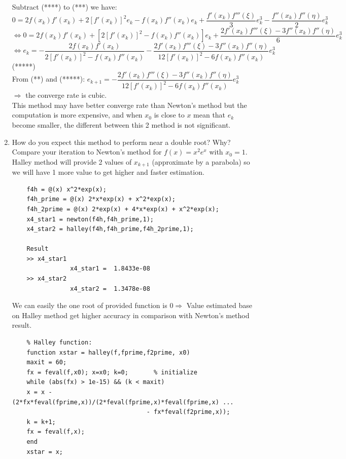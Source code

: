 \documentclass[14pt,a4paper]{article}
\begin{document}
\begin{enumerate}
	Subtract (****) to (***) we have:\\
	\hspace*{1cm} $ 0 = 2f(x_k)f'(x_k) + 2[f'(x_k)]^2e_k - f(x_k)f''(x_k)e_k + \dfrac{f'(x_k)f'''(\xi)}{3}e_k^3 - \dfrac{f''(x_k)f''(\eta)}{2}e_k^3$\\
	\hspace*{0.5cm} $\Leftrightarrow 0 = 2f(x_k)f'(x_k) + \left[2[f'(x_k)]^2 - f(x_k)f''(x_k)\right]e_k + \dfrac{2f'(x_k)f'''(\xi) -3f''(x_k)f''(\eta)}{6} e_k^3$\\
	\hspace*{0.5cm} $\Leftrightarrow e_k = -\dfrac{2f(x_k)f'(x_k)}{2[f'(x_k)]^2 - f(x_k)f''(x_k)} - \dfrac{2f'(x_k)f'''(\xi) -3f''(x_k)f''(\eta)}{12[f'(x_k)]^2 - 6f(x_k)f''(x_k)} e_k^3 $  \hspace{1cm} (*****)\\
	From (**) and (*****): $e_{k+1} = - \dfrac{2f'(x_k)f'''(\xi) -3f''(x_k)f''(\eta)}{12[f'(x_k)]^2 - 6f(x_k)f''(x_k)} e_k^3 $\\
	$\Rightarrow$ the converge rate is cubic.\\
	This method may have better converge rate than Newton's method but the computation is more expensive, and when $x_0$ is close to $x$ mean that $e_k$ become smaller, the different between this 2 method is not significant.
	
	\label{4h}
	\item How do you expect this method to perform near a double root? Why? Compare your iteration to Newton’s method for $f(x) = x^2e^x$ with $x_0 = 1$.\\
	Halley method will provide 2 values of $x_{k+1}$ (approximate by a parabola) so we will have 1 more value to get higher and faster estimation.
	\begin{lstlisting}
	f4h = @(x) x^2*exp(x);
	f4h_prime = @(x) 2*x*exp(x) + x^2*exp(x);
	f4h_2prime = @(x) 2*exp(x) + 4*x*exp(x) + x^2*exp(x);
	x4_star1 = newton(f4h,f4h_prime,1);
	x4_star2 = halley(f4h,f4h_prime,f4h_2prime,1);
	
	Result
	>> x4_star1
				x4_star1 =	1.8433e-08
	>> x4_star2
				x4_star2 =	1.3478e-08
	\end{lstlisting}
	We can easily the one root of provided function is $0 \Rightarrow$ Value estimated base on Halley method get higher accuracy in comparison with Newton's method result. 
	\begin{lstlisting}			
	% Halley function:
	function xstar = halley(f,fprime,f2prime, x0)
	maxit = 60; 
	fx = feval(f,x0); x=x0; k=0;       % initialize
	while (abs(fx) > 1e-15) && (k < maxit)
	x = x - (2*fx*feval(fprime,x))/(2*feval(fprime,x)*feval(fprime,x) ...
									 - fx*feval(f2prime,x));
	k = k+1;  
	fx = feval(f,x);
	end
	xstar = x;
	\end{lstlisting}
\end{enumerate}
	
\end{document}
